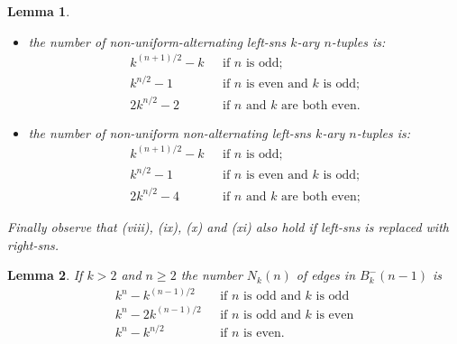\documentclass[10pt,a4paper]{amsart}
\newtheorem{lemma}{Lemma}
\begin{document}
\begin{lemma}
\begin{itemize}
\begin{align*}
\end{align*}
\item[x)] the number of non-uniform-alternating left-sns $k$-ary $n$-tuples is:
\begin{align*}
k^{(n+1)/2}-k & \mbox{~~if $n$ is odd;} \\
k^{n/2}-1 & \mbox{~~if $n$ is even and $k$ is odd;} \\
2k^{n/2}-2 & \mbox{~~if $n$ and $k$ are both even.}
\end{align*}
\item[xi)] the number of non-uniform non-alternating left-sns $k$-ary $n$-tuples is:
\begin{align*}
k^{(n+1)/2}-k & \mbox{~~if $n$ is odd;} \\
k^{n/2}-1 & \mbox{~~if $n$ is even and $k$ is odd;} \\
2k^{n/2}-4 & \mbox{~~if $n$ and $k$ are both even;}
\end{align*}
\end{itemize}
Finally observe that (viii), (ix), (x) and (xi) also hold if left-sns is replaced with right-sns.
\end{lemma}

\begin{lemma}  \label{lemma:number_non-negasymmetric_tuples}
If $k>2$ and $n\geq2$ the number $N_k(n)$ of edges in $B_k^-(n-1)$ is
\begin{align*}
k^n-k^{(n-1)/2} & \mbox{~~if $n$ is odd and $k$ is odd} \\
k^n-2k^{(n-1)/2} & \mbox{~~if $n$ is odd and $k$ is even} \\
k^n-k^{n/2} & \mbox{~~if $n$ is even.}
\end{align*}
\end{lemma}
\end{document}
